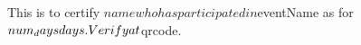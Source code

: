 \documentclass[12pt]{article}
\begin{document}
\thispagestyle{empty}
This is to certify $name who has participated in $eventName as for $num_days days.
\newline
Verify at $qrcode.
\end{document}
